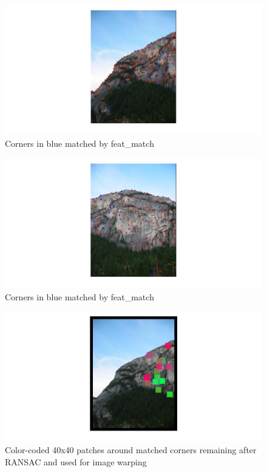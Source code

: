 \documentclass[english]{article}
\begin{document}
    \begin{figure}[h!]
        \includegraphics[width=1\textwidth]{anms_match1}
        \caption{Corners in blue matched by feat\_match}
        \label{fig:test1}
      \end{figure}
      
      \begin{figure}[h!]
              \includegraphics[width=1\textwidth]{anms_match2}
              \caption{Corners in blue matched by feat\_match}
              \label{fig:test1}
            \end{figure}
            
            \begin{figure}[h!]
                    \includegraphics[width=1\textwidth]{anms_realmatch1}
                    \caption{Color-coded 40x40 patches around matched corners remaining after RANSAC and used for image warping}
                    \label{fig:test1}
                  \end{figure}
                  
\end{document}
